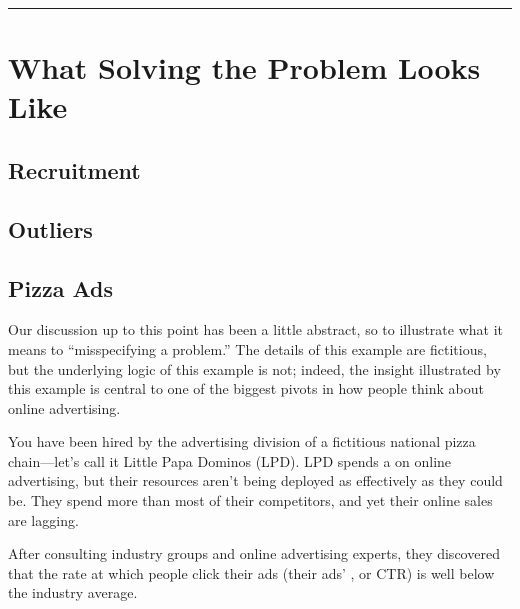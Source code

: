 \documentclass[letterpaper,10pt,english]{jupyterBook}
\begin{document}
\bigskip\hrule\bigskip


\sphinxstepscope


\section{What Solving the  Problem Looks Like}
\label{\detokenize{20_problems_to_questions/15_solving_the_wrong_problem:what-solving-the-wrong-problem-looks-like}}\label{\detokenize{20_problems_to_questions/15_solving_the_wrong_problem::doc}}

\subsection{Recruitment}
\label{\detokenize{20_problems_to_questions/15_solving_the_wrong_problem:recruitment}}

\subsection{Outliers}
\label{\detokenize{20_problems_to_questions/15_solving_the_wrong_problem:outliers}}

\subsection{Pizza Ads}
\label{\detokenize{20_problems_to_questions/15_solving_the_wrong_problem:pizza-ads}}
\sphinxAtStartPar
Our discussion up to this point has been a little abstract, so to illustrate what it means to “mis\sphinxhyphen{}specifying a problem.” The details of this example are fictitious, but the underlying logic of this example is not; indeed, the insight illustrated by this example is central to one of the biggest pivots in how people think about online advertising.

\sphinxAtStartPar
You have been hired by the advertising division of a fictitious national pizza chain—let’s call it Little Papa Dominos (LPD). LPD spends a  on online advertising, but their resources aren’t being deployed as effectively as they could be. They spend more than most of their competitors, and yet their online sales are lagging.

\sphinxAtStartPar
After consulting industry groups and online advertising experts, they discovered that the rate at which people click their ads (their ads’ , or CTR) is well below the industry average.
\end{document}
